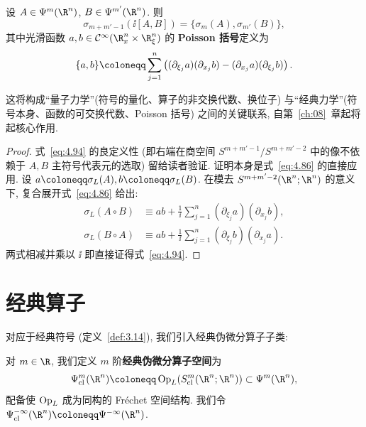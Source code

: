 \begin{proposition}[换位子的主符号定理]\label{prop:4.25}
设 $A \in \Psi^m(\R^n)$, $B \in \Psi^{m'}(\R^n)$. 则
\begin{equation}\label{eq:4.94}
    \sigma_{m+m'-1}(\ii [A, B]) = \{\sigma_m(A), \sigma_{m'}(B)\},
\end{equation}
其中光滑函数 $a, b \in \mathcal{C}^\infty(\R_x^n \times \R_\xi^n)$ 的 \textbf{Poisson 括号}定义为
\begin{equation}\label{eq:4.95}
    \{a, b\} \defeq \sum_{j=1}^n \left( (\partial_{\xi_j} a)(\partial_{x_j} b) - (\partial_{x_j} a)(\partial_{\xi_j} b) \right).
\end{equation}
\end{proposition}

这将构成``量子力学''(符号的量化、算子的非交换代数、换位子) 与``经典力学''(符号本身、函数的可交换代数、Poisson 括号) 之间的关键联系, 自第~\ref{ch:08}~章起将起核心作用.

\begin{proof}
式~\eqref{eq:4.94} 的良定义性 (即右端在商空间 $S^{m+m'-1} / S^{m+m'-2}$ 中的像不依赖于 $A, B$ 主符号代表元的选取) 留给读者验证.
证明本身是式~\eqref{eq:4.86} 的直接应用. 设 $a \defeq \sigma_L(A), b \defeq \sigma_L(B)$. 在模去 $S^{m+m'-2}(\R^n; \R^n)$ 的意义下, 复合展开式~\eqref{eq:4.86} 给出:
\begin{equation}\label{eq:4.96}
    \begin{aligned}
        \sigma_L(A \circ B) &\equiv a b + \frac{1}{\ii} \sum_{j=1}^n (\partial_{\xi_j} a)(\partial_{x_j} b), \\
        \sigma_L(B \circ A) &\equiv a b + \frac{1}{\ii} \sum_{j=1}^n (\partial_{\xi_j} b)(\partial_{x_j} a).
    \end{aligned}
\end{equation}
两式相减并乘以 $\ii$ 即直接证得式~\eqref{eq:4.94}.
\end{proof}

\section{经典算子}\label{sec:4.6}
%

对应于经典符号 (定义~\ref{def:3.14}), 我们引入经典伪微分算子子类:

\begin{definition}[经典伪微分算子]\label{def:4.26}
对 $m \in \R$, 我们定义 $m$ 阶\textbf{经典伪微分算子空间}为
\begin{equation}\label{eq:4.97}
    \Psi_{\mathrm{cl}}^m(\R^n) \defeq \Op_L(S_{\mathrm{cl}}^m(\R^n; \R^n)) \subset \Psi^m(\R^n),
\end{equation}
配备使 $\operatorname{Op}_L$ 成为同构的 Fréchet 空间结构. 我们令 $\Psi_{\mathrm{cl}}^{-\infty}(\R^n) \defeq \Psi^{-\infty}(\R^n)$.
\end{definition}

